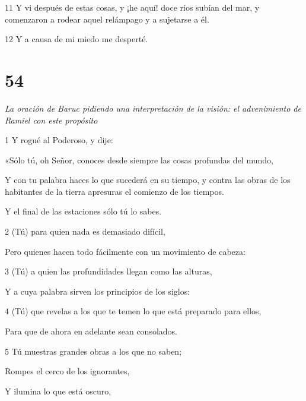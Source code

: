 \par 11 Y vi después de estas cosas, y ¡he aquí! doce ríos subían del mar, y comenzaron a rodear aquel relámpago y a sujetarse a él.

\par 12 Y a causa de mi miedo me desperté.

\chapter{54}

\par \textit{La oración de Baruc pidiendo una interpretación de la visión: el advenimiento de Ramiel con este propósito}


\par 1 Y rogué al Poderoso, y dije:

\par «Sólo tú, oh Señor, conoces desde siempre las cosas profundas del mundo,

\par Y con tu palabra haces lo que sucederá en su tiempo, y contra las obras de los habitantes de la tierra apresuras el comienzo de los tiempos.

\par Y el final de las estaciones sólo tú lo sabes.

\par 2 (Tú) para quien nada es demasiado difícil,

\par Pero quienes hacen todo fácilmente con un movimiento de cabeza:

\par 3 (Tú) a quien las profundidades llegan como las alturas,

\par Y a cuya palabra sirven los principios de los siglos:

\par 4 (Tú) que revelas a los que te temen lo que está preparado para ellos,

\par Para que de ahora en adelante sean consolados.

\par 5 Tú muestras grandes obras a los que no saben;

\par Rompes el cerco de los ignorantes,

\par Y ilumina lo que está oscuro,


